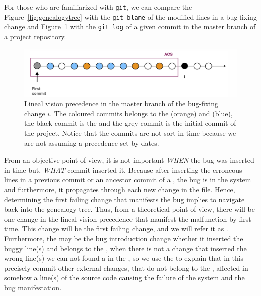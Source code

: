 \documentclass[a4paper, 12pt]{book}
\begin{document}
For those who are familiarized with \texttt{git}, we can compare the Figure~\ref{fig:genealogytree} with the \texttt{git blame} of the modified lines in a bug-fixing change and Figure~\ref{fig:precedence} with the \texttt{git log} of a given commit in the master branch of a project repository. 

\begin{figure}[ht]
\centering
\includegraphics[width=\columnwidth]{img/visionlog.png}
\caption{Lineal vision precedence in the master branch of the bug-fixing change $i$. The coloured commits belongs to the  (orange) and  (blue), the black commit is the \BFC and the grey commit is the initial commit of the project. Notice that the commits are not sort in time because we are not assuming a precedence set by dates.}
\label{fig:precedence}       %
\end{figure}



From an objective point of view, it is not important \emph{WHEN} the bug was inserted in time but, \emph{WHAT} commit inserted it. Because after inserting the erroneous lines in a previous commit or an ancestor commit of a \BFC, the bug is in the system and furthermore, it propagates through each new change in the file. Hence, determining the first failing change that manifests the bug implies to navigate back into the genealogy tree. Thus, from a theoretical point of view, there will be one change in the lineal vision precedence that manifest the malfunction by first time. This change will be the first failing change, and we will refer it as \FFC. Furthermore, the \FFC may be the bug introduction change whether it inserted the buggy line(s) and belongs to the \ACSet{\BFC}, when there is not a change that inserted the wrong line(s) we can not found a \BIC in the \ACSet{\BFC}, so we use the \FFC to explain that in this precisely commit other external changes, that do not belong to the \ACSet{\BFC}, affected in somehow a line(s) of the source code causing the failure of the system and the bug manifestation.
\end{document}
